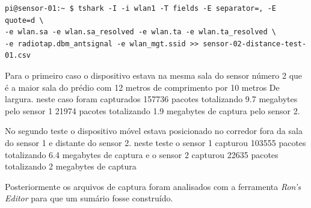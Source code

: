 \begin{verbatim}
pi@sensor-01:~ $ tshark -I -i wlan1 -T fields -E separator=, -E quote=d \
-e wlan.sa -e wlan.sa_resolved -e wlan.ta -e wlan.ta_resolved \
-e radiotap.dbm_antsignal -e wlan_mgt.ssid >> sensor-02-distance-test-01.csv
\end{verbatim}

Para o primeiro caso o dispositivo estava na mesma sala do sensor número 2 que é a maior
sala do prédio com 12  metros de comprimento por 10 metros  De largura. neste caso foram
capturados 157736 pacotes totalizando 9.7 megabytes pelo sensor 1 21974 pacotes totalizando
1.9 megabytes de captura pelo sensor 2.

No segundo teste o dispositivo móvel estava posicionado no corredor fora da sala do sensor 1
e distante do sensor 2.  neste teste o sensor 1 capturou 103555 pacotes totalizando 6.4 megabytes
de captura e o sensor 2 capturou 22635 pacotes totalizando 2 megabytes de captura

Posteriormente os arquivos de captura foram analisados com a ferramenta
\emph{Ron’s Editor} para que um sumário fosse construído.


